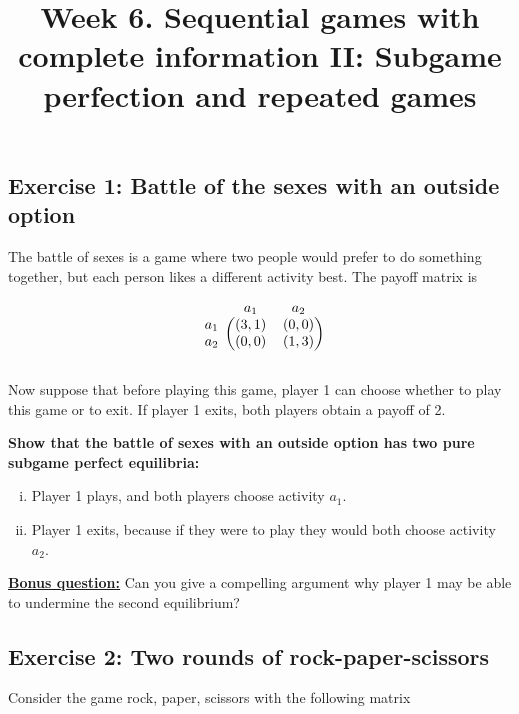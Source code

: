 \documentclass[10pt]{article}
\title{\textbf{Week 6.} Sequential games with complete information II: Subgame perfection and repeated games}
\date{}
\begin{document}
\maketitle
\vspace{-1cm}

\subsection*{Exercise 1: Battle of the sexes with an outside option}

The battle of sexes is a game where two people would prefer to do something
together, but each person likes a different activity best. The payoff matrix is

\begin{equation*}
    \begin{blockarray}{ccc}
        & a_1 & a_2 \\
        \begin{block}{c(cc)}
            a_1 & (3, 1) & (0, 0) \\
            a_2 & (0, 0) & (1, 3) \\
        \end{block}
    \end{blockarray}
\end{equation*}

Now suppose that before playing this game, player 1 can choose whether to play
this game or to exit. If player 1 exits, both players obtain a payoff of 2.

\textbf{Show that the battle of sexes with an outside option has two pure
subgame perfect equilibria:}

\begin{enumerate}[(i)]
    \item Player 1 plays, and both players choose activity \(a_1\).
    \item Player 1 exits, because if they were to play they would both choose
    activity \(a_2\).
\end{enumerate}

\underline{\textbf{Bonus question:}} Can you give a compelling argument why
player 1 may be able to undermine the second equilibrium?

\subsection*{Exercise 2: Two rounds of rock-paper-scissors}

Consider the game rock, paper, scissors with the following matrix
\end{document}
